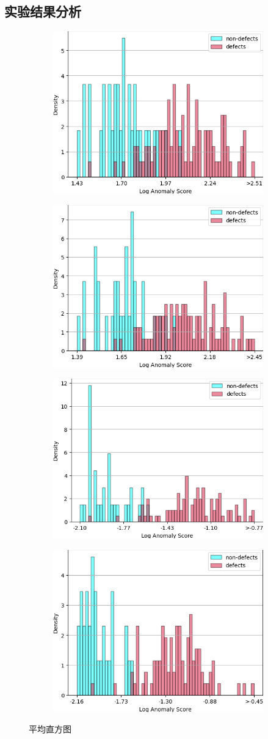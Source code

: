 \subsection{实验结果分析}
\begin{figure}[htbp]
    \centering
    \begin{subfigure}
        \centering
        \includegraphics[width=.4\linewidth]{figures/4/hist/ori_experiment/plastics_mean.png}  
      \end{subfigure}
      \begin{subfigure}
        \centering
        \includegraphics[width=.4\linewidth]{figures/4/hist/hog_experiment/plastics_mean.png} 
      \end{subfigure}
      \begin{subfigure}
        \centering
        \includegraphics[width=.4\linewidth]{figures/4/hist/mix_experiment/plastics_mean.png} 
      \end{subfigure}
      \begin{subfigure}
        \centering
        \includegraphics[width=.4\linewidth]{figures/4/hist/mixhog_experiment/plastics_mean.png} 
      \end{subfigure}
    \caption{平均直方图}
    \label{fig:hist_mean}
\end{figure}
